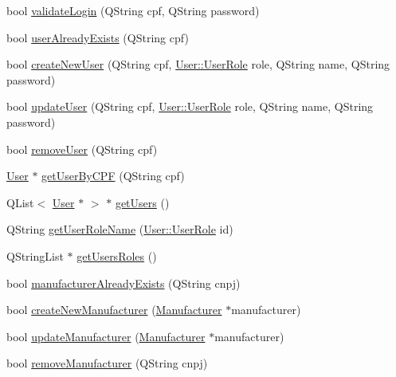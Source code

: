 \begin{DoxyCompactItemize}
\item 
bool \hyperlink{class_database_controller_a26b95409ccbc9070f1d8f955bffa2362}{validate\-Login} (\-Q\-String cpf, \-Q\-String password)
\item 
bool \hyperlink{class_database_controller_a8f337ea178400ba7212cd47af0f04a47}{user\-Already\-Exists} (\-Q\-String cpf)
\item 
bool \hyperlink{class_database_controller_aba650bf05743f9fd02afa5a20f06c765}{create\-New\-User} (\-Q\-String cpf, \hyperlink{class_user_a43f49d6a3bf5f000aea476bc641949b0}{\-User\-::\-User\-Role} role, \-Q\-String name, \-Q\-String password)
\item 
bool \hyperlink{class_database_controller_aec1a5d3b45341ae1fd600c8c7d1bd345}{update\-User} (\-Q\-String cpf, \hyperlink{class_user_a43f49d6a3bf5f000aea476bc641949b0}{\-User\-::\-User\-Role} role, \-Q\-String name, \-Q\-String password)
\item 
bool \hyperlink{class_database_controller_a6e70f75d6438f8b9174ce8d3f10eeef7}{remove\-User} (\-Q\-String cpf)
\item 
\hyperlink{class_user}{\-User} $\ast$ \hyperlink{class_database_controller_a420cde5e14fb8949cefe9d5984535636}{get\-User\-By\-C\-P\-F} (\-Q\-String cpf)
\item 
\-Q\-List$<$ \hyperlink{class_user}{\-User} $\ast$ $>$ $\ast$ \hyperlink{class_database_controller_a8092515456915cdf013b4e45a7335f04}{get\-Users} ()
\item 
\-Q\-String \hyperlink{class_database_controller_a82a98e4be056a922fd0c0cc114e24d76}{get\-User\-Role\-Name} (\hyperlink{class_user_a43f49d6a3bf5f000aea476bc641949b0}{\-User\-::\-User\-Role} id)
\item 
\-Q\-String\-List $\ast$ \hyperlink{class_database_controller_a532811bc79b53eab2a51bb3d713d1ee5}{get\-Users\-Roles} ()
\item 
bool \hyperlink{class_database_controller_a029f51270695bec012f32b47a557cde3}{manufacturer\-Already\-Exists} (\-Q\-String cnpj)
\item 
bool \hyperlink{class_database_controller_a54844c72da5949212f675f0889366eec}{create\-New\-Manufacturer} (\hyperlink{class_manufacturer}{\-Manufacturer} $\ast$manufacturer)
\item 
bool \hyperlink{class_database_controller_a42a8014107204b27e4be3083b4127454}{update\-Manufacturer} (\hyperlink{class_manufacturer}{\-Manufacturer} $\ast$manufacturer)
\item 
bool \hyperlink{class_database_controller_a258f73f95e802dc0fbd079124097a5d1}{remove\-Manufacturer} (\-Q\-String cnpj)

\end{DoxyCompactItemize}
